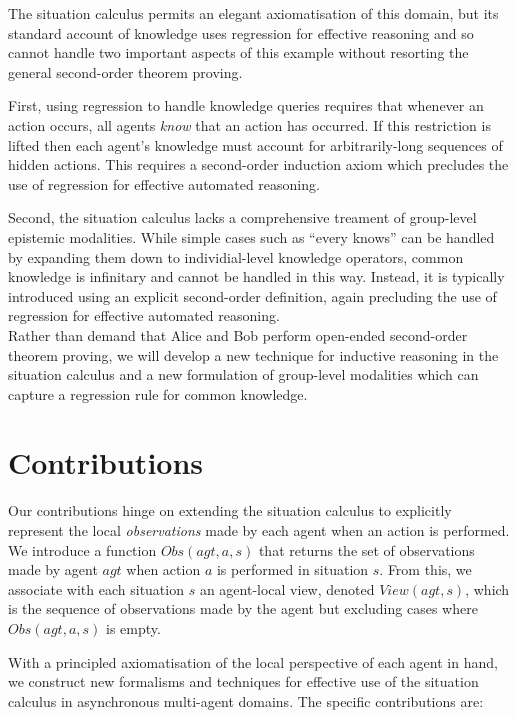 The situation calculus permits an elegant axiomatisation of this domain,
but its standard account of knowledge uses regression for effective
reasoning and so cannot handle two important aspects of this example
without resorting the general second-order theorem proving.

First, using regression to handle knowledge queries requires that
whenever an action occurs, all agents \emph{know} that an action has
occurred. If this restriction is lifted then each agent's knowledge
must account for arbitrarily-long sequences of hidden actions. This
requires a second-order induction axiom which precludes the use of
regression for effective automated reasoning. 

Second, the situation calculus lacks a comprehensive treament of group-level
epistemic modalities. While simple cases such as {}``every knows''
can be handled by expanding them down to individial-level knowledge
operators, common knowledge is infinitary and cannot be handled in
this way. Instead, it is typically introduced using an explicit second-order
definition, again precluding the use of regression for effective automated
reasoning.\\


Rather than demand that Alice and Bob perform open-ended second-order
theorem proving, we will develop a new technique for inductive reasoning
in the situation calculus and a new formulation of group-level modalities
which can capture a regression rule for common knowledge.


\section{Contributions}

Our contributions hinge on extending the situation calculus to explicitly
represent the local \emph{observations} made by each agent when an
action is performed. We introduce a function $Obs(agt,a,s)$ that
returns the set of observations made by agent $agt$ when action $a$
is performed in situation $s$. From this, we associate with each
situation $s$ an agent-local view, denoted $View(agt,s)$, which
is the sequence of observations made by the agent but excluding cases
where $Obs(agt,a,s)$ is empty.

With a principled axiomatisation of the local perspective of each
agent in hand, we construct new formalisms and techniques for effective
use of the situation calculus in asynchronous multi-agent domains.
The specific contributions are:

